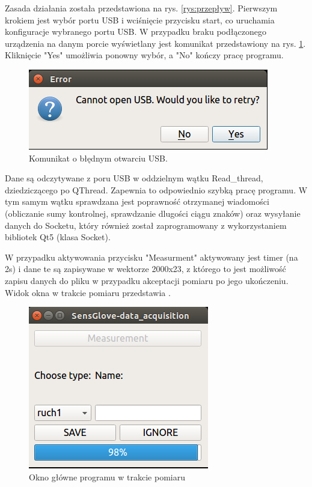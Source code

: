 \documentclass{article}
\begin{document}
Zasada działania została przedstawiona na rys. \ref{rys:przepływ}. 
Pierwszym krokiem jest wybór portu USB i wciśnięcie przycisku start, co uruchamia konfiguracje wybranego portu USB. W przypadku braku podłączonego urządzenia na danym porcie wyświetlany jest komunikat przedstawiony na rys. \ref{rys:oknousb}. Kliknięcie "Yes" umożliwia ponowny wybór, a "No" kończy pracę programu.\\
\begin{figure}[h!]
    \begin{center}
    \includegraphics[scale=0.6]{oknousb.png}
    \caption{Komunikat o błędnym otwarciu USB.}
    \label{rys:oknousb}
    \end{center}
\end{figure}
Dane są odczytywane z poru USB w oddzielnym wątku Read\_thread, dziedziczącego po QThread. Zapewnia to odpowiednio szybką pracę programu. W tym samym wątku sprawdzana jest poprawność otrzymanej wiadomości (obliczanie sumy kontrolnej, sprawdzanie dlugości ciągu znaków) oraz wysyłanie danych do Socketu, który również został zaprogramowany z wykorzystaniem bibliotek Qt5 (klasa Socket).

W przypadku aktywowania przycisku "Measurment" aktywowany jest timer (na 2s) i dane te są zapisywane w wektorze 2000x23, z którego to jest możliwość zapisu danych do pliku w przypadku akceptacji pomiaru po jego ukończeniu. Widok okna w trakcie pomiaru przedstawia .
\begin{figure}[h!]
    \centering
    \includegraphics[scale=0.6]{oknopomiar.png}
    \caption{Okno główne programu w trakcie pomiaru}
    \label{rys:oknopomiar}
\end{figure}
\end{document}
